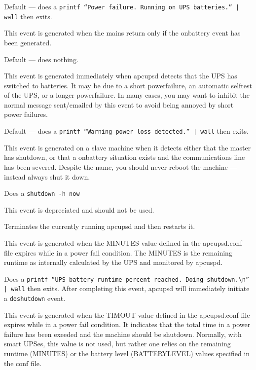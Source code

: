 {{{{{{{{\begin{description}
Default {---} does a {\tt printf ``Power failure. Running on UPS batteries.''
| wall} then exits.  

\item [offbattery]
   This event is generated when the mains return only if the onbattery event has
been generated.  

Default {---} does nothing.  

\item [powerout]
   This event is generated immediately when apcupsd detects that the UPS has
switched to batteries. It may be due to a short powerfailure, an automatic
selftest of the UPS, or a longer powerfailure. In many cases, you may want to
inhibit the normal message sent/emailed by this event to avoid being annoyed
by short power failures.  

Default {---} does a {\tt printf ``Warning power loss detected.'' | wall} then
exits.  

\item [remotedown]
   This event is generated on a slave machine when it detects either that the
master has shutdown, or that a onbattery situation exists and the
communications line has been severed. Despite the name, you should never
reboot the machine {---} instead always shut it down.  

Does a {\tt shutdown -h now}  

\item [restartme]
   This event is depreciated and should not be used.  

Terminates the currently running apcupsd and then restarts it.  

\item [runlimit]
   This event is generated when the MINUTES value defined in the apcupsd.conf
file expires while in a power fail condition. The MINUTES is the remaining
runtime as internally calculated by the UPS and monitored by apcuspd.  

Does a {\tt printf ``UPS battery runtime percent reached. Doing
shutdown.\textbackslash{}n'' | wall} then exits.  After completing this event,
apcupsd will immediately initiate a {\tt doshutdown} event.  

\item [timeout]
   This event is generated when the TIMOUT value defined in the apcupsd.conf file
expires while in a power fail condition. It indicates that the total time in a
power failure has been exeeded and the machine should be shutdown. Normally,
with smart UPSes, this value is not used, but rather one relies on the
remaining runtime (MINUTES) or the battery level (BATTERYLEVEL) values
specified in the conf file.  


\end{description}}}}}}}}}
